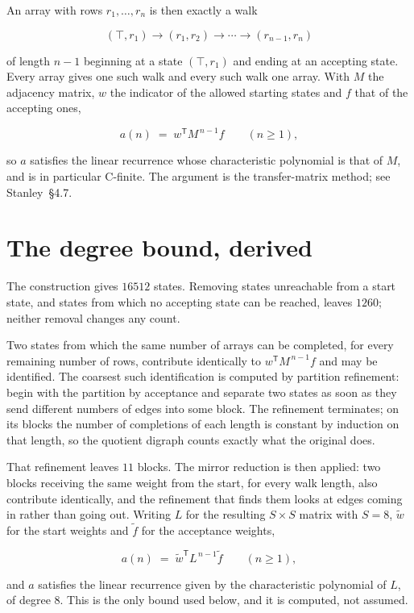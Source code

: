\documentclass[11pt]{article}
\theoremstyle{definition}
\begin{document}
An array with rows $r_1,\dots,r_n$ is then exactly a walk

\[(\top,r_1) \to (r_1,r_2) \to \cdots \to (r_{n-1},r_n)\]

of length $n-1$ beginning at a state $(\top,r_1)$ and ending at an accepting state. Every array gives one such walk and every such walk one array. With $M$ the adjacency matrix, $w$ the indicator of the allowed starting states and $f$ that of the accepting ones,

\[a(n) \;=\; w^{\mathsf T} M^{\,n-1} f \qquad (n \ge 1),\]

so $a$ satisfies the linear recurrence whose characteristic polynomial is that of $M$, and is in particular C-finite. The argument is the transfer-matrix method; see Stanley~\S4.7.

\section{The degree bound, derived}

The construction gives $16512$ states. Removing states unreachable from a start state, and states from which no accepting state can be reached, leaves $1260$; neither removal changes any count.

Two states from which the same number of arrays can be completed, for every remaining number of rows, contribute identically to $w^{\mathsf T}M^{\,n-1}f$ and may be identified. The coarsest such identification is computed by partition refinement: begin with the partition by acceptance and separate two states as soon as they send different numbers of edges into some block. The refinement terminates; on its blocks the number of completions of each length is constant by induction on that length, so the quotient digraph counts exactly what the original does.

That refinement leaves $11$ blocks. The mirror reduction is then applied: two blocks receiving the same weight from the start, for every walk length, also contribute identically, and the refinement that finds them looks at edges coming in rather than going out. Writing $L$ for the resulting $S \times S$ matrix with $S = 8$, $\tilde w$ for the start weights and $\tilde f$ for the acceptance weights,

\[a(n) \;=\; \tilde w^{\mathsf T} L^{\,n-1} \tilde f \qquad (n \ge 1),\]

and $a$ satisfies the linear recurrence given by the characteristic polynomial of $L$, of degree $8$. This is the only bound used below, and it is computed, not assumed.
\end{document}
